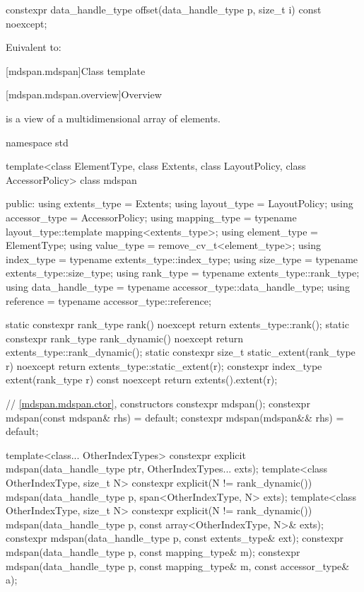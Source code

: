 %
\begin{itemdecl}
constexpr data_handle_type offset(data_handle_type p, size_t i) const noexcept;
\end{itemdecl}

\begin{itemdescr}
\pnum
\effects
Euivalent to: 
\end{itemdescr}

[mdspan.mdspan]{Class template }

[mdspan.mdspan.overview]{Overview}

\pnum
{} is a view of a multidimensional array of elements.

\begin{codeblock}
namespace std {
  template<class ElementType, class Extents, class LayoutPolicy, class AccessorPolicy>
  class mdspan {
  public:
    using extents_type = Extents;
    using layout_type = LayoutPolicy;
    using accessor_type = AccessorPolicy;
    using mapping_type = typename layout_type::template mapping<extents_type>;
    using element_type = ElementType;
    using value_type = remove_cv_t<element_type>;
    using index_type = typename extents_type::index_type;
    using size_type = typename extents_type::size_type;
    using rank_type = typename extents_type::rank_type;
    using data_handle_type = typename accessor_type::data_handle_type;
    using reference = typename accessor_type::reference;

    static constexpr rank_type rank() noexcept { return extents_type::rank(); }
    static constexpr rank_type rank_dynamic() noexcept { return extents_type::rank_dynamic(); }
    static constexpr size_t static_extent(rank_type r) noexcept
      { return extents_type::static_extent(r); }
    constexpr index_type extent(rank_type r) const noexcept { return extents().extent(r); }

    // \ref{mdspan.mdspan.ctor}, constructors
    constexpr mdspan();
    constexpr mdspan(const mdspan& rhs) = default;
    constexpr mdspan(mdspan&& rhs) = default;

    template<class... OtherIndexTypes>
      constexpr explicit mdspan(data_handle_type ptr, OtherIndexTypes... exts);
    template<class OtherIndexType, size_t N>
      constexpr explicit(N != rank_dynamic())
        mdspan(data_handle_type p, span<OtherIndexType, N> exts);
    template<class OtherIndexType, size_t N>
      constexpr explicit(N != rank_dynamic())
        mdspan(data_handle_type p, const array<OtherIndexType, N>& exts);
    constexpr mdspan(data_handle_type p, const extents_type& ext);
    constexpr mdspan(data_handle_type p, const mapping_type& m);
    constexpr mdspan(data_handle_type p, const mapping_type& m, const accessor_type& a);

}}
\end{codeblock}
